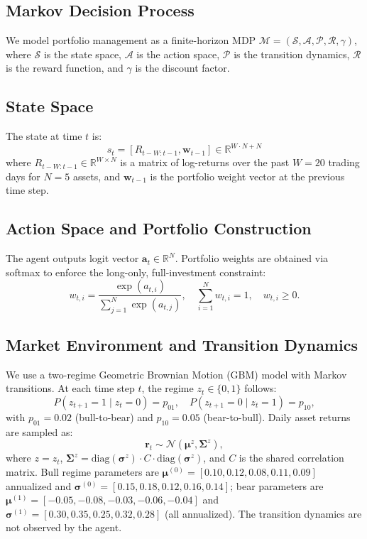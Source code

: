 \documentclass[conference]{IEEEtran}
\begin{document}
\subsection{Markov Decision Process}
We model portfolio management as a finite-horizon MDP
$\mathcal{M} = (\mathcal{S}, \mathcal{A}, \mathcal{P}, \mathcal{R}, \gamma)$,
where $\mathcal{S}$ is the state space, $\mathcal{A}$ is the action space,
$\mathcal{P}$ is the transition dynamics, $\mathcal{R}$ is the reward function,
and $\gamma$ is the discount factor.

\subsection{State Space}
The state at time $t$ is:
\begin{equation}
s_t = \left[ R_{t-W:t-1}, \mathbf{w}_{t-1} \right] \in \mathbb{R}^{W \cdot N + N}
\end{equation}
where $R_{t-W:t-1} \in \mathbb{R}^{W \times N}$ is a matrix of log-returns over
the past $W=20$ trading days for $N=5$ assets, and $\mathbf{w}_{t-1}$ is the
portfolio weight vector at the previous time step.

\subsection{Action Space and Portfolio Construction}
The agent outputs logit vector $\mathbf{a}_t \in \mathbb{R}^N$. Portfolio weights
are obtained via softmax to enforce the long-only, full-investment constraint:
\begin{equation}
w_{t,i} = \frac{\exp(a_{t,i})}{\sum_{j=1}^{N} \exp(a_{t,j})}, \quad
\sum_{i=1}^{N} w_{t,i} = 1, \quad w_{t,i} \geq 0.
\end{equation}

\subsection{Market Environment and Transition Dynamics}
We use a two-regime Geometric Brownian Motion (GBM) model with Markov transitions.
At each time step $t$, the regime $z_t \in \{0, 1\}$ follows:
\begin{equation}
P(z_{t+1}=1 \mid z_t=0) = p_{01},\quad P(z_{t+1}=0 \mid z_t=1) = p_{10},
\end{equation}
with $p_{01}=0.02$ (bull-to-bear) and $p_{10}=0.05$ (bear-to-bull). Daily asset
returns are sampled as:
\begin{equation}
\mathbf{r}_t \sim \mathcal{N}(\bm{\mu}^z,
\bm{\Sigma}^z),
\end{equation}
where $z=z_t$, $\bm{\Sigma}^z = \mathrm{diag}(\bm{\sigma}^z) \cdot C \cdot
\mathrm{diag}(\bm{\sigma}^z)$, and $C$ is the shared correlation matrix.
Bull regime parameters are $\bm{\mu}^{(0)} = [0.10, 0.12, 0.08, 0.11, 0.09]$
annualized and $\bm{\sigma}^{(0)} = [0.15, 0.18, 0.12, 0.16, 0.14]$; bear
parameters are $\bm{\mu}^{(1)} = [-0.05, -0.08, -0.03, -0.06, -0.04]$ and
$\bm{\sigma}^{(1)} = [0.30, 0.35, 0.25, 0.32, 0.28]$ (all annualized). The
transition dynamics are not observed by the agent.
\end{document}
